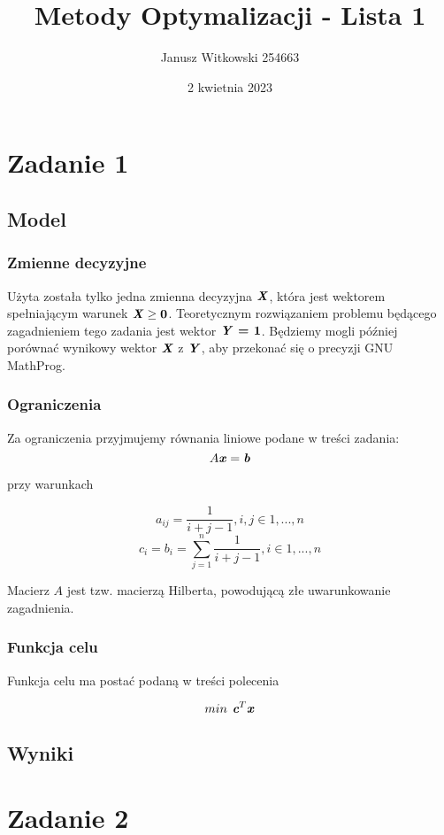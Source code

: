 \documentclass{article}
\title{Metody Optymalizacji - Lista 1}
\author{Janusz Witkowski 254663}
\date{2 kwietnia 2023}
\theoremstyle{definition}
\theoremstyle{remark}
\theoremstyle{plain}
\theoremstyle{remark}
\theoremstyle{plain}
\begin{document}
\maketitle

\section{Zadanie 1}
\subsection{Model}
\subsubsection{Zmienne decyzyjne}
Użyta została tylko jedna zmienna decyzyjna $\textbf{\textit{X}}$, która jest wektorem spełniającym warunek $\textbf{\textit{X}} \geq \textbf{0}$.
Teoretycznym rozwiązaniem problemu będącego zagadnieniem tego zadania jest wektor $\textbf{\textit{Y}} \textbf{ = 1} $.
Będziemy mogli później porównać wynikowy wektor $\textbf{\textit{X}}$ z $\textbf{\textit{Y}}$, aby przekonać się o precyzji GNU MathProg.

\subsubsection{Ograniczenia}
Za ograniczenia przyjmujemy równania liniowe podane w treści zadania:
\[A\textbf{\textit{x}}=\textbf{\textit{b}}\]

przy warunkach

\[a_{ij} = \frac{1}{i+j-1}, i,j \in 1,...,n\]
\[c_i = b_i = \sum_{j=1}^n{\frac{1}{i+j-1}}, i \in 1,...,n\]

Macierz $A$ jest tzw. macierzą Hilberta, powodującą złe uwarunkowanie zagadnienia.

\subsubsection{Funkcja celu}
Funkcja celu ma postać podaną w treści polecenia 

\[ min {\textit{{\textbf{ c}}}}^T \textbf{\textit{x}} \]

\subsection{Wyniki}
    
        
\section{Zadanie 2}
\end{document}
